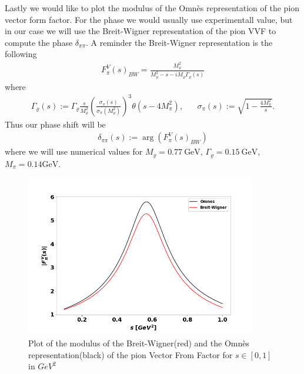 \documentclass[a4paper]{article}
\begin{document}
Lastly we would like to plot the modulus of the Omn\`es representation of the
pion vector form
factor. For the phase we would usually use experimentall value, but in our case
we will use the Breit-Wigner representation of the pion VVF to compute the
phase $\delta_{\pi\pi}$. A reminder the Breit-Wigner representation is the
following
\begin{align}
    F^V_\pi(s)_{BW} = \frac{M_\varrho^2}{M_\varrho^2 - s - iM_\varrho
    \Gamma_\varrho(s)}
\end{align}
where
\begin{align}
    \Gamma_\varrho(s) := \Gamma_\varrho\frac{s}{M_\varrho^2} \left(
    \frac{\sigma_\pi(s)}{\sigma_\pi(M_\varrho^2)}
    \right)^3 \theta(s-4M_\pi^2), \;\;\;\;\;\; \sigma_\pi(s) :=
    \sqrt{1-\frac{4M_\pi^2}{s}}.
\end{align}
Thus our phase shift will be
\begin{align}
    \delta_{\pi\pi}(s) := \arg\left(F_\pi^V(s)_{BW}\right)
\end{align}
where we will use numerical values for $M_\varrho = 0.77\ \text{GeV}$,
$\Gamma_\varrho = 0.15\ \text{GeV}$, $M_\pi = 0.14 \text{GeV}$.
\begin{figure}[H]
    \centering
    \includegraphics[width=0.9\textwidth]{./omnes_bw.png}
    \caption{Plot of the modulus of the Breit-Wigner(red) and the Omn\`es
    representation(black) of the pion Vector From Factor for $s \in [0, 1]$ in $GeV^2$}
\end{figure}
\nocite{mathe}
\nocite{stoffer}
\nocite{omnes}
\printbibliography
\end{document}
